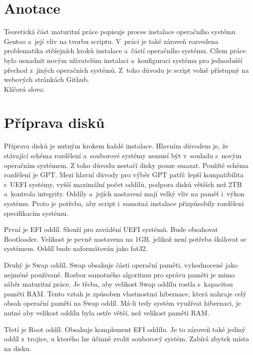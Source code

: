\documentclass[12pt,a4paper,twoside,]{article}
\begin{document}
\newpage
\renewcommand{\contentsname}{\textsf{Obsah}}\tableofcontents

\newpage
\section{\textsf{Anotace}}
{Teoretická část maturitní práce popisuje proces instalace operačního systému Gentoo
	a~její vliv na tvorbu scriptu. V~práci je také zároveň rozvedena problematika stěžejních
	kroků instalace a~částí operačního systému. Cílem práce bylo usnadnit novým uživatelům instalaci a~konfiguraci
	systému pro jednodušší přechod z~jiných operačních systémů. Z~toho důvodu je script volně přístupný na webových stránkách Github. 
	\vspace{2cm}
	\\Klíčová slova:
}


\newpage

\section{\textsf{Příprava disků}}
{Příprava disků je nutným krokem každé instalace. Hlavním důvodem je, 
že stávající schéma rozdělení a~souborové systémy nemusí být v~souladu s~novým operačním systémem. 
Z toho důvodu nestačí disky pouze smazat. Použíté schéma rozdělení je GPT. 
Mezi hlavní důvody pro výběr GPT patří: lepší kompatibilita s~UEFI systémy, 
vyšší maximální počet oddílů, podpora disků větších než 2TB a~kontrola integrity.
Oddíly a~jejích nastavení mají velký vliv na paměť i~výkon systému. Proto je potřeba, 
aby script i~samotná instalace přizpůsobily rozdělení specifikacím systému.} 

{První je EFI oddíl. Slouží pro zavádění UEFI systémů. Bude obsahovat Bootloader. 
Velikost je pevně nastavena na 1GB, jelikož není potřeba škálovat se systémem.
Oddíl bude naformátován jako fat32.}

{Druhý je Swap oddíl. Swap obsahuje části operační paměti, vyhodnocené jako nejméně používané. 
Rozbor samotného algoritmu pro správu paměti je mimo záběr maturitní práce. Je třeba,
aby velikost Swap oddílu rostla s~kapacitou paměti RAM. Tento vztah je způsoben vlastnostmi hibernace, 
která nahraje celý obsah operační paměti na Swap oddíl. Má-li tedy systém využívat hibernaci, je nutné
aby velikost oddílu byla ostře větší, než velikost paměti RAM. }

{Třetí je Root oddíl. Obsahuje komplement EFI oddílu. Je to zároveň také jediný oddíl z~trojice, 
u kterého lze účinně zvolit souborový systém. Zabírá zbytek místa na disku.}
\end{document}
